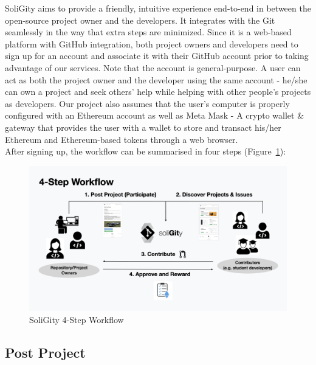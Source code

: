 \documentclass[12pt]{article}
\renewcommand{\_}{\kern-1.5pt\textunderscore\kern-1.5pt}
\begin{document}
SoliGity aims to provide a friendly, intuitive experience end-to-end in between the open-source project owner and the developers. It integrates with the Git seamlessly in the way that extra steps are minimized. Since it is a web-based platform with GitHub integration, both project owners and developers need to sign up for an account and associate it with their GitHub account prior to taking advantage of our services. Note that the account is general-purpose. A user can act as both the project owner and the developer using the same account - he/she can own a project and seek others’ help while helping with other people’s projects as developers. Our project also assumes that the user’s computer is properly configured with an Ethereum account as well as Meta Mask - A crypto wallet \& gateway that provides the user with a wallet to store and transact his/her Ethereum and Ethereum-based tokens through a web browser. \\

\noindent After signing up, the workflow can be summarised in four steps (Figure~\ref{fig:workflow1}):

\begin{figure}[H]
	\centering
	\includegraphics[width=16.5cm]{graphs/00a. workflow.jpeg}
	\caption{SoliGity 4-Step Workflow}
	\label{fig:workflow1}
\end{figure}



\renewcommand\thesubsection{Step \arabic{subsection}.}
\renewcommand\thesubsubsection{\arabic{subsubsection}.}

\subsection{Post Project}
\end{document}
